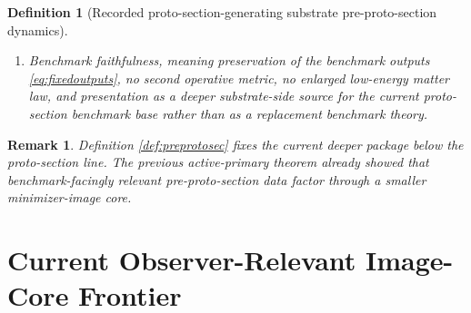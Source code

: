 \documentclass[11pt]{article}
\newcommand{\ProtoSectionShell}[1]{\mathcal Z_{#1}^{\mathrm{psec}}}
\newcommand{\PreProtoSectionProj}[1]{\Pi_{#1}^{\mathrm{ppsec}}}
\newcommand{\PreProtoSectionFiber}[2]{\mathcal F_{#1}^{\mathrm{ppsec}}(#2)}
\newcommand{\PreProtoSectionFunctional}[1]{\mathscr F_{#1}^{\mathrm{ppsec}}}
\newcommand{\PreProtoSectionShell}[1]{\mathcal Z_{#1}^{\mathrm{ppsec}}}
\newtheorem{definition}{Definition}
\newtheorem{remark}{Remark}
\begin{document}
\begin{definition}[Recorded proto-section-generating substrate pre-proto-section dynamics]
\begin{enumerate}
\[    \begin{array}{l}
    \PreProtoSectionProj{\sigma}(u)\in\ProtoSectionShell{\sigma},\\[0.2em]
    \PreProtoSectionFunctional{\sigma}(u)
    =
    \displaystyle\min_{v\in\PreProtoSectionFiber{\sigma}{\PreProtoSectionProj{\sigma}(u)}}
    \PreProtoSectionFunctional{\sigma}(v)
    \end{array}
    \right\},
    \]
    and
    \[
    \PreProtoSectionProj{\sigma}\big|_{\PreProtoSectionShell{\sigma}}
    :
    \PreProtoSectionShell{\sigma}
    \xrightarrow{\cong}
    \ProtoSectionShell{\sigma}
    \]
    is a diffeomorphism.
    \item Benchmark faithfulness, meaning preservation of the benchmark outputs \eqref{eq:fixedoutputs}, no second operative metric, no enlarged low-energy matter law, and presentation as a deeper substrate-side source for the current proto-section benchmark base rather than as a replacement benchmark theory.
\end{enumerate}
\end{definition}

\begin{remark}
Definition \ref{def:preprotosec} fixes the current deeper package below the proto-section line. The previous active-primary theorem already showed that benchmark-facingly relevant pre-proto-section data factor through a smaller minimizer-image core.
\end{remark}

\section{Current Observer-Relevant Image-Core Frontier}
\end{document}
